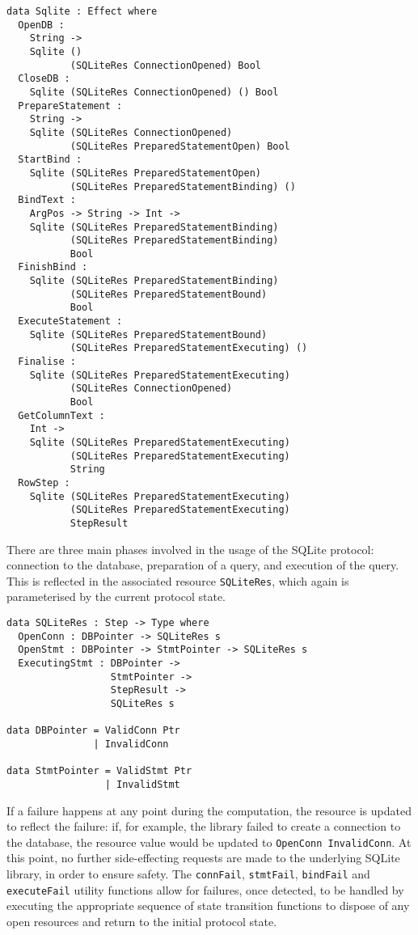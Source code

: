 \documentclass[preprint]{sigplanconf}
\begin{document}
\begin{Verbatim}[samepage]
data Sqlite : Effect where
  OpenDB : 
    String -> 
    Sqlite () 
           (SQLiteRes ConnectionOpened) Bool
  CloseDB : 
    Sqlite (SQLiteRes ConnectionOpened) () Bool
  PrepareStatement : 
    String -> 
    Sqlite (SQLiteRes ConnectionOpened) 
           (SQLiteRes PreparedStatementOpen) Bool
  StartBind : 
    Sqlite (SQLiteRes PreparedStatementOpen) 
           (SQLiteRes PreparedStatementBinding) ()
  BindText : 
    ArgPos -> String -> Int -> 
    Sqlite (SQLiteRes PreparedStatementBinding) 
           (SQLiteRes PreparedStatementBinding) 
           Bool
  FinishBind : 
    Sqlite (SQLiteRes PreparedStatementBinding) 
           (SQLiteRes PreparedStatementBound) 
           Bool
  ExecuteStatement : 
    Sqlite (SQLiteRes PreparedStatementBound) 
           (SQLiteRes PreparedStatementExecuting) ()
  Finalise : 
    Sqlite (SQLiteRes PreparedStatementExecuting) 
           (SQLiteRes ConnectionOpened) 
           Bool
  GetColumnText : 
    Int -> 
    Sqlite (SQLiteRes PreparedStatementExecuting)
           (SQLiteRes PreparedStatementExecuting)
           String
  RowStep : 
    Sqlite (SQLiteRes PreparedStatementExecuting)
           (SQLiteRes PreparedStatementExecuting)
           StepResult
\end{Verbatim}
There are three main phases involved in the usage of the SQLite protocol: connection to the database, preparation of a query, and execution of the query. This is reflected in the associated resource \texttt{SQLiteRes}, which again is parameterised by the current protocol state.
\begin{Verbatim}
data SQLiteRes : Step -> Type where
  OpenConn : DBPointer -> SQLiteRes s
  OpenStmt : DBPointer -> StmtPointer -> SQLiteRes s
  ExecutingStmt : DBPointer -> 
                  StmtPointer -> 
                  StepResult -> 
                  SQLiteRes s
                  
data DBPointer = ValidConn Ptr
               | InvalidConn

data StmtPointer = ValidStmt Ptr
                 | InvalidStmt 
\end{Verbatim}
If a failure happens at any point during the computation, the resource is updated to reflect the failure: if, for example, the library failed to create a connection to the database, the resource value would be updated to \texttt{OpenConn InvalidConn}. At this point, no further side-effecting requests are made to the underlying SQLite library, in order to ensure safety. The \texttt{connFail}, \texttt{stmtFail}, \texttt{bindFail} and \texttt{executeFail} utility functions allow for failures, once detected, to be handled by executing the appropriate sequence of state transition functions to dispose of any open resources and return to the initial protocol state. 
\end{document}
